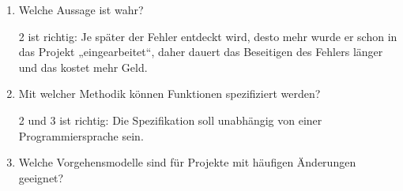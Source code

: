 \documentclass{bschlangaul-aufgabe}
\begin{document}
\begin{enumerate}


\item Welche Aussage ist wahr?


\begin{bAntwort}
2 ist richtig: Je später der Fehler entdeckt wird, desto mehr wurde er
schon in das Projekt „eingearbeitet“, daher dauert das Beseitigen des
Fehlers länger und das kostet mehr Geld.
\end{bAntwort}


\item  Mit welcher Methodik können Funktionen spezifiziert werden?


\begin{bAntwort}
2 und 3 ist richtig: Die Spezifikation soll unabhängig von einer
Programmiersprache sein.
\end{bAntwort}


\item Welche Vorgehensmodelle sind für Projekte mit häufigen Änderungen
geeignet?



\end{enumerate}
\end{document}
